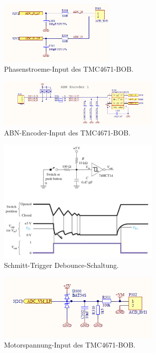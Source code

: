 \begin{figure}[H]
	\centering
	\includegraphics[width=0.5\textwidth]{graphics/TMC4671_Phasenstroeme_BOB_Schematic}
	\caption{Phasenstroeme-Input des TMC4671-BOB. \cite[S.4]{trinamicmotion_control_gmbh__co_kg_tmc4671-bob_2020}}
	\label{fig:Schema_Phasenstroeme_FOC_Treiber}
\end{figure} 

\begin{figure}[H]
	\centering
	\includegraphics[width=0.7\textwidth]{graphics/TMC4671_ABN_Encoder_BOB_Schematic}
	\caption{ABN-Encoder-Input des TMC4671-BOB. \cite[S.3]{trinamicmotion_control_gmbh__co_kg_tmc4671-bob_2020}}
	\label{fig:Schema_ABN_Encoder_FOC_Treiber}
\end{figure} 

\begin{figure}[H]
	\centering
	\includegraphics[width=0.7\textwidth]{graphics/Schmitt_Trigger_Debounce}
	\caption{Schmitt-Trigger Debounce-Schaltung. \cite[3:00]{kleitz_sec_2011}}
	\label{fig:Schmitt_Trigger_Debounce}
\end{figure} 

\begin{figure}[H]
	\centering
	\includegraphics[width=0.7\textwidth]{graphics/TMC4671_Motorspannung_BOB_Schematic}
	\caption{Motorspannung-Input des TMC4671-BOB. \cite[S.4]{trinamicmotion_control_gmbh__co_kg_tmc4671-bob_2020}}
	\label{fig:Schema_Motorspannung_FOC_Treiber}
\end{figure} 

